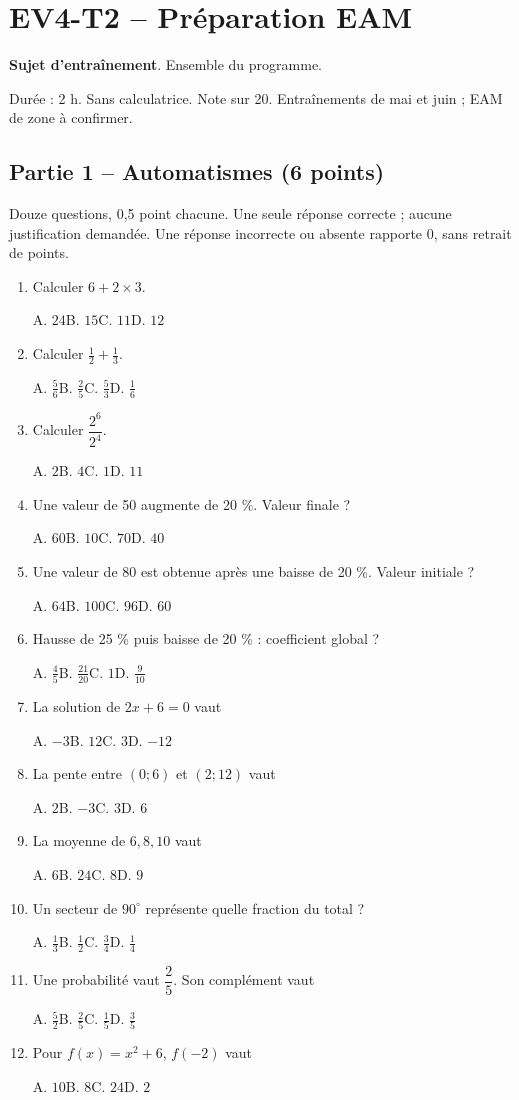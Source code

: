 \clearpage\section*{EV4-T2 -- Préparation EAM}\label{EV4-T2}
\textbf{Sujet d’entraînement}. Ensemble du programme.\par Durée : 2 h. Sans calculatrice. Note sur 20. Entraînements de mai et juin ; EAM de zone à confirmer.
\subsection*{Partie 1 -- Automatismes (6 points)}
Douze questions, 0,5 point chacune. Une seule réponse correcte ; aucune justification demandée. Une réponse incorrecte ou absente rapporte 0, sans retrait de points.
\begin{enumerate}
\item Calculer $6+2\times3$.\par A. $24$\quad B. $15$\quad C. $11$\quad D. $12$
\item Calculer $\frac12+\frac13$.\par A. $\frac{5}{6}$\quad B. $\frac{2}{5}$\quad C. $\frac{5}{3}$\quad D. $\frac{1}{6}$
\item Calculer $\dfrac{2^6}{2^{4}}$.\par A. $2$\quad B. $4$\quad C. $1$\quad D. $11$
\item Une valeur de 50 augmente de 20 \%. Valeur finale ?\par A. $60$\quad B. $10$\quad C. $70$\quad D. $40$
\item Une valeur de 80 est obtenue après une baisse de 20 \%. Valeur initiale ?\par A. $64$\quad B. $100$\quad C. $96$\quad D. $60$
\item Hausse de 25 \% puis baisse de 20 \% : coefficient global ?\par A. $\frac{4}{5}$\quad B. $\frac{21}{20}$\quad C. $1$\quad D. $\frac{9}{10}$
\item La solution de $2x+6=0$ vaut\par A. $-3$\quad B. $12$\quad C. $3$\quad D. $-12$
\item La pente entre $(0;6)$ et $(2;12)$ vaut\par A. $2$\quad B. $-3$\quad C. $3$\quad D. $6$
\item La moyenne de $6, 8, 10$ vaut\par A. $6$\quad B. $24$\quad C. $8$\quad D. $9$
\item Un secteur de $90^\circ$ représente quelle fraction du total ?\par A. $\frac{1}{3}$\quad B. $\frac{1}{2}$\quad C. $\frac{3}{4}$\quad D. $\frac{1}{4}$
\item Une probabilité vaut $\dfrac{2}{5}$. Son complément vaut\par A. $\frac{5}{2}$\quad B. $\frac{2}{5}$\quad C. $\frac{1}{5}$\quad D. $\frac{3}{5}$
\item Pour $f(x)=x^2+6$, $f(-2)$ vaut\par A. $10$\quad B. $8$\quad C. $24$\quad D. $2$
\end{enumerate}
